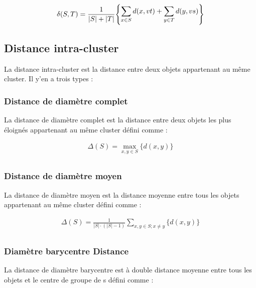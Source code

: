 \begin{equation}
	\delta (S,T) = \frac{1}{\left\lvert S \right\rvert  + \left\lvert T \right\rvert  }  \Bigg\{
\begin{tabular}{@{}l@{}}
   \(\displaystyle \sum_{x \in S} d(x,vt) + \sum_{y \in T}d(y,vs) \)
\end{tabular} \Bigg\}
\end{equation}

\subsection{Distance intra-cluster}
La distance intra-cluster est la distance entre deux objets appartenant au même cluster. Il y’en a trois types :

\subsubsection{Distance de diamètre complet}
La distance de diamètre complet est la distance entre deux objets les plus éloignés appartenant au même cluster défini comme :

\begin{equation}
	\begin{split}
		\Delta (S) = \max_{x,y \in S} \{ d(x,y) \}  \\
	\end{split}
\end{equation}

\subsubsection{Distance de diamètre moyen}
La distance de diamètre moyen est la distance moyenne entre tous les objets appartenant au même cluster défini comme :

\begin{equation}
	\begin{split}
		\Delta (S) = \frac{1}{\left\lvert S \right\rvert \cdot  (\left\lvert S \right\rvert - 1)} \sum_{x,y \in S ; x \neq y} \{ d(x,y) \} \\
	\end{split}
\end{equation}

\subsubsection{Diamètre barycentre Distance}
La distance de diamètre barycentre est à double distance moyenne entre tous les objets et le centre de groupe de s défini comme :

